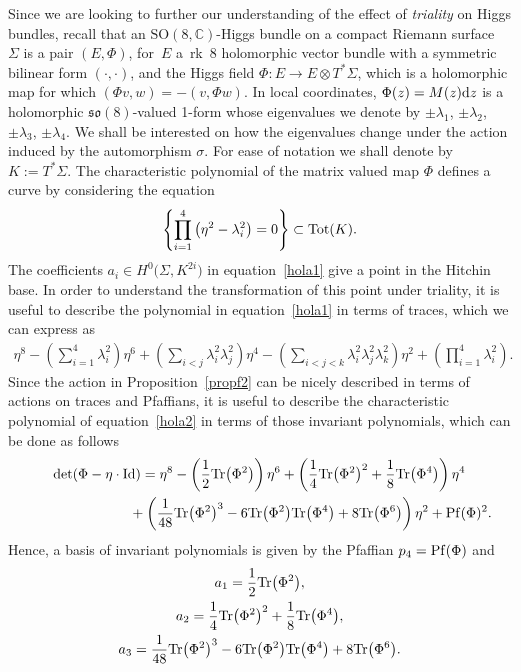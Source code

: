 \documentclass[10pt,a4paper]{amsart}
\numberwithin{equation}{section}
\newcommand{\Id}{\operatorname{Id}}
\newcommand{\SO}{{\mathrm{SO}}}
\begin{document}
Since we are looking to further our understanding of the effect of {\it triality} on Higgs bundles, recall that an $\SO(8,\mathbb{C})$-Higgs bundle on a compact Riemann surface~$\Sigma$ is a pair $(E,\Phi)$, for~$E$ a~rk~8 holomorphic vector bundle with a symmetric bilinear form $(\cdot,\cdot)$, and the Higgs field $\Phi\colon E\rightarrow E\otimes T^*\Sigma$, which is a holomorphic map for which $(\Phi v,w)=-(v,\Phi w)$. In local coordinates, $\Phi (z) = M(z) {\rm d}z$ is a holomorphic $\mathfrak{so}(8)$-valued 1-form whose eigenvalues we denote by $\pm \lambda_1$, $\pm \lambda_2$, $\pm \lambda_3$, $\pm \lambda_4$. We shall be interested on how the eigenvalues change under the action induced by the automorphism $\sigma$. For ease of notation we shall denote by $K:=T^*\Sigma$. The characteristic polynomial of the matrix valued map $\Phi$ defines a curve by considering the equation \begin{eqnarray}
\left\{
 \prod_{i=1}^4\big(\eta^2-\lambda_i^2\big)=0
\right\}\subset {\rm Tot}(K).\label{hola1}
\end{eqnarray}
The coefficients $a_i\in H^{0}\big(\Sigma,K^{2i}\big)$ in equation~\eqref{hola1} give a point in the Hitchin base. In order to understand the transformation of this point under triality, it is useful to describe the polynomial in equation~\eqref{hola1} in terms of traces, which we can express as
\begin{eqnarray}
 \eta^8-\left(\sum_{i=1}^4\lambda_i^2\right)\eta^6+\left(\sum_{i<j}\lambda_i^2\lambda_j^2\right)\eta^4 -\left(\sum_{i<j<k}\lambda_i^2\lambda_j^2\lambda_k^2\right)\eta^2+\left(\prod_{i=1}^4\lambda_i^2\right). \label{hola2}
\end{eqnarray}
Since the action in Proposition~\ref{propf2} can be nicely described in terms of actions on traces and Pfaffians, it is useful to describe the characteristic polynomial of equation~\eqref{hola2} in terms of those invariant polynomials, which can be done as follows
\begin{gather*}
\det(\Phi-\eta \cdot \Id)
 = \eta^8-\left(\frac{1}{2}{\rm Tr}\big(\Phi^2\big)\right)\eta^6+
\left(\frac{1}{4}{\rm Tr}\big(\Phi^2\big)^2+\frac{1}{8}{\rm Tr}\big(\Phi^4\big)
\right)\eta^4\nonumber\\
\hphantom{\det(\Phi-\eta \cdot \Id)=}{} +
\left(\frac{1}{48}{\rm Tr}\big(\Phi^2\big)^3-6{\rm Tr}\big(\Phi^2\big){\rm Tr}\big(\Phi^4\big)+8{\rm Tr}\big(\Phi^6\big)
\right)\eta^2
+{\rm Pf}(\Phi)^2. %
\end{gather*}
Hence, a basis of invariant polynomials is given by the Pfaffian $p_4={\rm Pf}(\Phi)$ and
\begin{gather*}
a_1=\frac{1}{2}{\rm Tr}\big(\Phi^2\big), \\
a_2= \frac{1}{4}{\rm Tr}\big(\Phi^2\big)^2+\frac{1}{8}{\rm Tr}\big(\Phi^4\big),
 \\
a_3= \frac{1}{48}{\rm Tr}\big(\Phi^2\big)^3-6{\rm Tr}\big(\Phi^2\big){\rm Tr}\big(\Phi^4\big)+8{\rm Tr}\big(\Phi^6\big).
\end{gather*}
\end{document}
